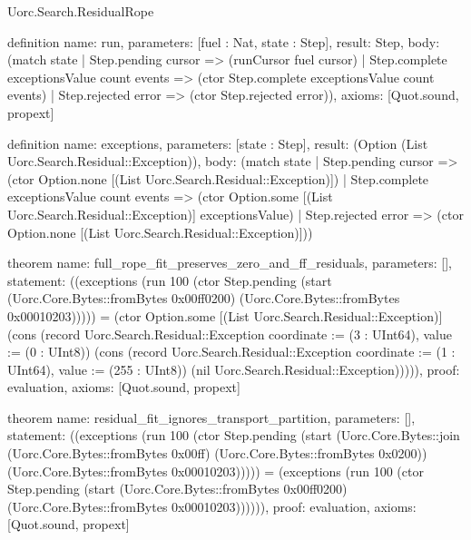 \begin{lexlean}{Uorc.Search.ResidualRope}
\begin{semanticmodule}
definition{
  name: run,
  parameters: [fuel : Nat, state : Step],
  result: Step,
  body: (match state
    | Step.pending cursor => (runCursor fuel cursor)
    | Step.complete exceptionsValue count events => (ctor Step.complete exceptionsValue count events)
    | Step.rejected error => (ctor Step.rejected error)),
  axioms: [Quot.sound, propext]
}

definition{
  name: exceptions,
  parameters: [state : Step],
  result: (Option (List Uorc.Search.Residual::Exception)),
  body: (match state
    | Step.pending cursor => (ctor Option.none [(List Uorc.Search.Residual::Exception)])
    | Step.complete exceptionsValue count events => (ctor Option.some [(List Uorc.Search.Residual::Exception)] exceptionsValue)
    | Step.rejected error => (ctor Option.none [(List Uorc.Search.Residual::Exception)]))
}

theorem{
  name: full_rope_fit_preserves_zero_and_ff_residuals,
  parameters: [],
  statement: ((exceptions (run 100 (ctor Step.pending (start (Uorc.Core.Bytes::fromBytes 0x00ff0200) (Uorc.Core.Bytes::fromBytes 0x00010203))))) = (ctor Option.some [(List Uorc.Search.Residual::Exception)] (cons (record Uorc.Search.Residual::Exception {coordinate := (3 : UInt64), value := (0 : UInt8)}) (cons (record Uorc.Search.Residual::Exception {coordinate := (1 : UInt64), value := (255 : UInt8)}) (nil Uorc.Search.Residual::Exception))))),
  proof: evaluation{},
  axioms: [Quot.sound, propext]
}

theorem{
  name: residual_fit_ignores_transport_partition,
  parameters: [],
  statement: ((exceptions (run 100 (ctor Step.pending (start (Uorc.Core.Bytes::join (Uorc.Core.Bytes::fromBytes 0x00ff) (Uorc.Core.Bytes::fromBytes 0x0200)) (Uorc.Core.Bytes::fromBytes 0x00010203))))) = (exceptions (run 100 (ctor Step.pending (start (Uorc.Core.Bytes::fromBytes 0x00ff0200) (Uorc.Core.Bytes::fromBytes 0x00010203)))))),
  proof: evaluation{},
  axioms: [Quot.sound, propext]
}
\end{semanticmodule}
\end{lexlean}
